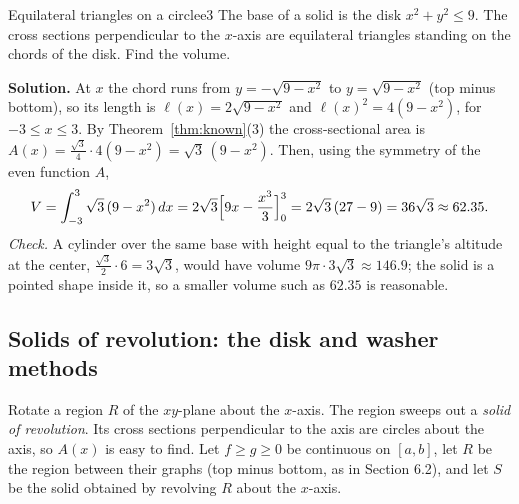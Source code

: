 \documentclass[11pt]{article}
\begin{document}
\begin{exmp}{Equilateral triangles on a circle}{e3}
The base of a solid is the disk $x^2+y^2\le9$. The cross sections perpendicular to the $x$-axis are equilateral triangles standing on the chords of the disk. Find the volume.

\textbf{Solution.} At $x$ the chord runs from $y=-\sqrt{9-x^2}$ to $y=\sqrt{9-x^2}$ (top minus bottom), so its length is $\ell(x)=2\sqrt{9-x^2}$ and $\ell(x)^2=4(9-x^2)$, for $-3\le x\le3$. By Theorem~\ref{thm:known}(3) the cross-sectional area is $A(x)=\frac{\sqrt3}4\cdot4(9-x^2)=\sqrt3\,(9-x^2)$.
Then, using the symmetry of the even function $A$,
\[
V=\int_{-3}^3\sqrt3\,(9-x^2)\,dx=2\sqrt3\Bigl[9x-\frac{x^3}3\Bigr]_0^3=2\sqrt3\,(27-9)=36\sqrt3\approx62.35 .
\]
\emph{Check.} A cylinder over the same base with height equal to the triangle's altitude at the center, $\frac{\sqrt3}2\cdot6=3\sqrt3$, would have volume $9\pi\cdot3\sqrt3\approx146.9$; the solid is a pointed shape inside it, so a smaller volume such as $62.35$ is reasonable.
\end{exmp}

\subsection*{Solids of revolution: the disk and washer methods}

Rotate a region $R$ of the $xy$-plane about the $x$-axis. The region sweeps out a \emph{solid of revolution}. Its cross sections perpendicular to the axis are circles about the axis, so $A(x)$ is easy to find. Let $f\ge g\ge0$ be continuous on $[a,b]$, let $R$ be the region between their graphs (top minus bottom, as in Section 6.2), and let $S$ be the solid obtained by revolving $R$ about the $x$-axis.
\end{document}
